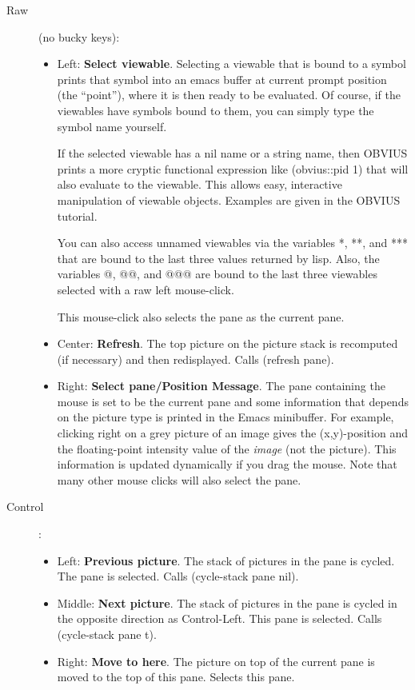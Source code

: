 \begin{description}

\item [Raw] (no bucky keys):  
\begin{itemize}
\item Left: {\bf Select viewable}.  Selecting a viewable that is bound
to a symbol prints that symbol into an emacs buffer at current prompt
position (the ``point''), where it is then ready to be evaluated.  
Of course, if the viewables have symbols bound to them, you can simply
type the symbol name yourself.

If the selected viewable has a nil name or a string name, then OBVIUS
prints a more cryptic functional expression like (obvius::pid 1) that
will also evaluate to the viewable.  This allows easy, interactive
manipulation of viewable objects.  Examples are given in the OBVIUS
tutorial.

You can also access unnamed viewables via the variables *, **, and ***
that are bound to the last three values returned by lisp. Also, the
variables @, @@, and @@@ are bound to the last three viewables
selected with a raw left mouse-click.

This mouse-click also selects the pane as the current pane.

\item Center: {\bf Refresh}.  The top picture on the picture stack is
recomputed (if necessary) and then redisplayed.  Calls (refresh pane).

\item Right: {\bf Select pane/Position Message}.  The pane containing
the mouse is set to be the current pane and some information that
depends on the picture type is printed in the Emacs minibuffer.  For
example, clicking right on a grey picture of an image gives the
(x,y)-position and the floating-point intensity value of the {\em
image} (not the picture).  This information is updated dynamically if
you drag the mouse.  Note that many other mouse clicks will also
select the pane.
\end{itemize}

\item [Control]:
\begin{itemize}
\item  Left: {\bf Previous picture}.  The stack of pictures in the
pane is cycled.  The pane is selected.  Calls (cycle-stack pane nil).
\item  Middle: {\bf Next picture}. The stack of pictures in the pane
is cycled in the opposite direction as Control-Left.  This pane is
selected.  Calls (cycle-stack pane t).
\item  Right: {\bf Move to here}.  The picture on top of the current
pane is moved to the top of this pane.  Selects this pane.
\end{itemize}


\end{description}
